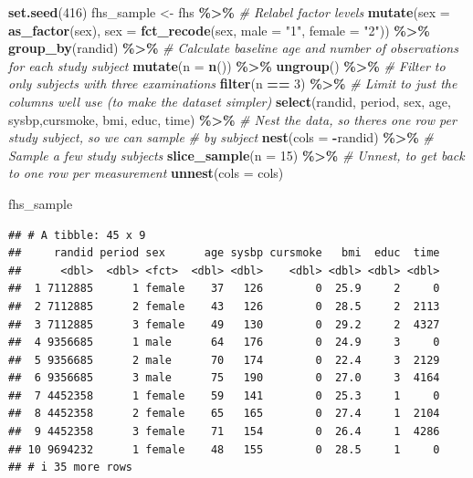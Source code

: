 \documentclass[
]{book}
\newenvironment{Shaded}{\begin{snugshade}}{\end{snugshade}}
\newcommand{\AttributeTok}[1]{\textcolor[rgb]{0.13,0.29,0.53}{#1}}
\newcommand{\CommentTok}[1]{\textcolor[rgb]{0.56,0.35,0.01}{\textit{#1}}}
\newcommand{\DecValTok}[1]{\textcolor[rgb]{0.00,0.00,0.81}{#1}}
\newcommand{\FunctionTok}[1]{\textcolor[rgb]{0.13,0.29,0.53}{\textbf{#1}}}
\newcommand{\NormalTok}[1]{#1}
\newcommand{\OtherTok}[1]{\textcolor[rgb]{0.56,0.35,0.01}{#1}}
\newcommand{\SpecialCharTok}[1]{\textcolor[rgb]{0.81,0.36,0.00}{\textbf{#1}}}
\newcommand{\StringTok}[1]{\textcolor[rgb]{0.31,0.60,0.02}{#1}}
\begin{document}
\begin{Shaded}
\begin{Highlighting}[]
\FunctionTok{set.seed}\NormalTok{(}\DecValTok{416}\NormalTok{)}
\NormalTok{fhs\_sample }\OtherTok{\textless{}{-}}\NormalTok{ fhs }\SpecialCharTok{\%\textgreater{}\%} 
  \CommentTok{\# Relabel factor levels}
  \FunctionTok{mutate}\NormalTok{(}\AttributeTok{sex =} \FunctionTok{as\_factor}\NormalTok{(sex),}
         \AttributeTok{sex =} \FunctionTok{fct\_recode}\NormalTok{(sex, }
                          \AttributeTok{male =} \StringTok{"1"}\NormalTok{, }
                          \AttributeTok{female =} \StringTok{"2"}\NormalTok{)) }\SpecialCharTok{\%\textgreater{}\%} 
  \FunctionTok{group\_by}\NormalTok{(randid) }\SpecialCharTok{\%\textgreater{}\%} 
  \CommentTok{\# Calculate baseline age and number of observations for each study subject}
  \FunctionTok{mutate}\NormalTok{(}\AttributeTok{n =} \FunctionTok{n}\NormalTok{()) }\SpecialCharTok{\%\textgreater{}\%} 
  \FunctionTok{ungroup}\NormalTok{() }\SpecialCharTok{\%\textgreater{}\%} 
  \CommentTok{\# Filter to only subjects with three examinations}
  \FunctionTok{filter}\NormalTok{(n }\SpecialCharTok{==} \DecValTok{3}\NormalTok{) }\SpecialCharTok{\%\textgreater{}\%} 
  \CommentTok{\# Limit to just the columns we\textquotesingle{}ll use (to make the dataset simpler)}
  \FunctionTok{select}\NormalTok{(randid, period, sex, age, sysbp,cursmoke, bmi, educ, time) }\SpecialCharTok{\%\textgreater{}\%} 
  \CommentTok{\# Nest the data, so there\textquotesingle{}s one row per study subject, so we can sample }
  \CommentTok{\# by subject}
  \FunctionTok{nest}\NormalTok{(}\AttributeTok{cols =} \SpecialCharTok{{-}}\NormalTok{randid) }\SpecialCharTok{\%\textgreater{}\%} 
  \CommentTok{\# Sample a few study subjects}
  \FunctionTok{slice\_sample}\NormalTok{(}\AttributeTok{n =} \DecValTok{15}\NormalTok{) }\SpecialCharTok{\%\textgreater{}\%} 
  \CommentTok{\# Unnest, to get back to one row per measurement}
  \FunctionTok{unnest}\NormalTok{(}\AttributeTok{cols =}\NormalTok{ cols)}

\NormalTok{fhs\_sample}
\end{Highlighting}
\end{Shaded}

\begin{verbatim}
## # A tibble: 45 x 9
##     randid period sex      age sysbp cursmoke   bmi  educ  time
##      <dbl>  <dbl> <fct>  <dbl> <dbl>    <dbl> <dbl> <dbl> <dbl>
##  1 7112885      1 female    37   126        0  25.9     2     0
##  2 7112885      2 female    43   126        0  28.5     2  2113
##  3 7112885      3 female    49   130        0  29.2     2  4327
##  4 9356685      1 male      64   176        0  24.9     3     0
##  5 9356685      2 male      70   174        0  22.4     3  2129
##  6 9356685      3 male      75   190        0  27.0     3  4164
##  7 4452358      1 female    59   141        0  25.3     1     0
##  8 4452358      2 female    65   165        0  27.4     1  2104
##  9 4452358      3 female    71   154        0  26.4     1  4286
## 10 9694232      1 female    48   155        0  28.5     1     0
## # i 35 more rows
\end{verbatim}
\end{document}
